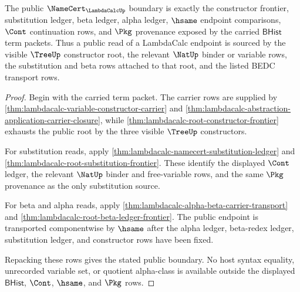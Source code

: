 \begin{theorem}
\label{thm:lambdacalc-namecert-public-boundary}
The public $\NameCert_{\LambdaCalcUp}$ boundary is exactly the constructor frontier, substitution ledger, beta ledger, alpha ledger, $\hsame$ endpoint comparisons, $\Cont$ continuation rows, and $\Pkg$ provenance exposed by the carried $\mathsf{BHist}$ term packets. Thus a public read of a LambdaCalc endpoint is sourced by the visible $\TreeUp$ constructor root, the relevant $\NatUp$ binder or variable rows, the substitution and beta rows attached to that root, and the listed BEDC transport rows.
\end{theorem}
\begin{proof}
Begin with the carried term packet. The carrier rows are supplied by \autoref{thm:lambdacalc-variable-constructor-carrier} and \autoref{thm:lambdacalc-abstraction-application-carrier-closure}, while \autoref{thm:lambdacalc-root-constructor-frontier} exhausts the public root by the three visible $\TreeUp$ constructors.

For substitution reads, apply \autoref{thm:lambdacalc-namecert-substitution-ledger} and \autoref{thm:lambdacalc-root-substitution-frontier}. These identify the displayed $\Cont$ ledger, the relevant $\NatUp$ binder and free-variable rows, and the same $\Pkg$ provenance as the only substitution source.

For beta and alpha reads, apply \autoref{thm:lambdacalc-alpha-beta-carrier-transport} and \autoref{thm:lambdacalc-root-beta-ledger-frontier}. The public endpoint is transported componentwise by $\hsame$ after the alpha ledger, beta-redex ledger, substitution ledger, and constructor rows have been fixed.

Repacking these rows gives the stated public boundary. No host syntax equality, unrecorded variable set, or quotient alpha-class is available outside the displayed $\mathsf{BHist}$, $\Cont$, $\hsame$, and $\Pkg$ rows.
\end{proof}

